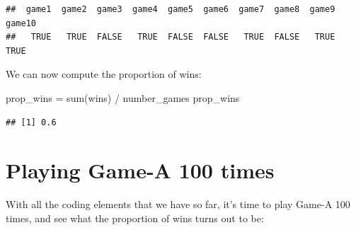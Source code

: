 \documentclass[
]{book}
\newenvironment{Shaded}{\begin{snugshade}}{\end{snugshade}}
\newcommand{\FunctionTok}[1]{\textcolor[rgb]{0.00,0.00,0.00}{#1}}
\newcommand{\NormalTok}[1]{#1}
\newcommand{\OtherTok}[1]{\textcolor[rgb]{0.56,0.35,0.01}{#1}}
\newcommand{\SpecialCharTok}[1]{\textcolor[rgb]{0.00,0.00,0.00}{#1}}
\begin{document}
\begin{verbatim}
##  game1  game2  game3  game4  game5  game6  game7  game8  game9 game10 
##   TRUE   TRUE  FALSE   TRUE  FALSE  FALSE   TRUE  FALSE   TRUE   TRUE
\end{verbatim}

We can now compute the proportion of wins:

\begin{Shaded}
\begin{Highlighting}[]
\NormalTok{prop\_wins }\OtherTok{=} \FunctionTok{sum}\NormalTok{(wins) }\SpecialCharTok{/}\NormalTok{ number\_games}
\NormalTok{prop\_wins}
\end{Highlighting}
\end{Shaded}

\begin{verbatim}
## [1] 0.6
\end{verbatim}

\hypertarget{playing-game-a-100-times}{%
\chapter{Playing Game-A 100 times}\label{playing-game-a-100-times}}

With all the coding elements that we have so far, it's time to play Game-A 100
times, and see what the proportion of wins turns out to be:
\end{document}
